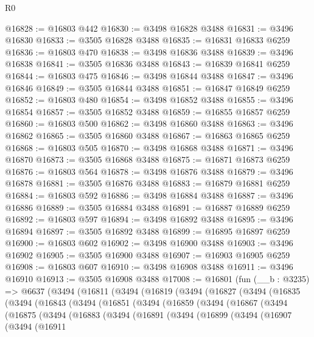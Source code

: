 \begin{lexlean}{R0}
\begin{coremodule}
@16828 := @16803 @442
@16830 := @3498 @16828 @3488
@16831 := @3496 @16830
@16833 := @3505 @16828 @3488
@16835 := @16831 @16833 @6259
@16836 := @16803 @470
@16838 := @3498 @16836 @3488
@16839 := @3496 @16838
@16841 := @3505 @16836 @3488
@16843 := @16839 @16841 @6259
@16844 := @16803 @475
@16846 := @3498 @16844 @3488
@16847 := @3496 @16846
@16849 := @3505 @16844 @3488
@16851 := @16847 @16849 @6259
@16852 := @16803 @480
@16854 := @3498 @16852 @3488
@16855 := @3496 @16854
@16857 := @3505 @16852 @3488
@16859 := @16855 @16857 @6259
@16860 := @16803 @500
@16862 := @3498 @16860 @3488
@16863 := @3496 @16862
@16865 := @3505 @16860 @3488
@16867 := @16863 @16865 @6259
@16868 := @16803 @505
@16870 := @3498 @16868 @3488
@16871 := @3496 @16870
@16873 := @3505 @16868 @3488
@16875 := @16871 @16873 @6259
@16876 := @16803 @564
@16878 := @3498 @16876 @3488
@16879 := @3496 @16878
@16881 := @3505 @16876 @3488
@16883 := @16879 @16881 @6259
@16884 := @16803 @592
@16886 := @3498 @16884 @3488
@16887 := @3496 @16886
@16889 := @3505 @16884 @3488
@16891 := @16887 @16889 @6259
@16892 := @16803 @597
@16894 := @3498 @16892 @3488
@16895 := @3496 @16894
@16897 := @3505 @16892 @3488
@16899 := @16895 @16897 @6259
@16900 := @16803 @602
@16902 := @3498 @16900 @3488
@16903 := @3496 @16902
@16905 := @3505 @16900 @3488
@16907 := @16903 @16905 @6259
@16908 := @16803 @607
@16910 := @3498 @16908 @3488
@16911 := @3496 @16910
@16913 := @3505 @16908 @3488
@17008 := @16801
    (fun (__b : @3235) =>
    @6637
      (@3494
        (@16811
          (@3494
            (@16819
              (@3494
                (@16827
                  (@3494
                    (@16835
                      (@3494
                        (@16843
                          (@3494
                            (@16851
                              (@3494
                                (@16859
                                  (@3494
                                    (@16867
                                      (@3494
                                        (@16875
                                          (@3494
                                            (@16883
                                              (@3494
                                                (@16891
                                                  (@3494
                                                    (@16899
                                                      (@3494
                                                        (@16907
                                                          (@3494
                                                            (@16911

\end{coremodule}
\end{lexlean}
